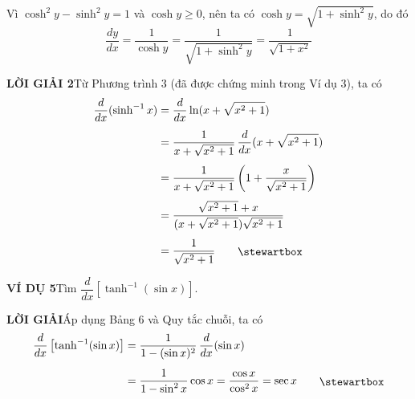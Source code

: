 \noindent
\begin{minipage}[t]{0.26\linewidth}
    \strut
\end{minipage}%
\hfill
\begin{minipage}[t]{0.72\linewidth}
    Vì $\cosh^2 y - \sinh^2 y = 1$ và $\cosh y \geqslant 0$, nên ta có $\cosh y = \sqrt{1 + \sinh^2 y}$, do đó
    \[
    \frac{dy}{dx} = \frac{1}{\cosh y} = \frac{1}{\sqrt{1 + \sinh^2 y}} = \frac{1}{\sqrt{1 + x^2}}
    \]

    \vspace{0.6em}
    \noindent
    \textbf{\textsf{\color{stewartcyan}LỜI GIẢI 2}}\quad Từ Phương trình 3 (đã được chứng minh trong Ví dụ 3), ta có
    \begin{align*}
    \frac{d}{dx}(\sinh^{-1} x) &= \frac{d}{dx}\ln(x + \sqrt{x^2 + 1}) \\[4pt]
    &= \frac{1}{x + \sqrt{x^2 + 1}}\,\frac{d}{dx}(x + \sqrt{x^2 + 1}) \\[4pt]
    &= \frac{1}{x + \sqrt{x^2 + 1}}\left(1 + \frac{x}{\sqrt{x^2 + 1}}\right) \\[4pt]
    &= \frac{\sqrt{x^2 + 1} + x}{(x + \sqrt{x^2 + 1})\sqrt{x^2 + 1}} \\[4pt]
    &= \frac{1}{\sqrt{x^2 + 1}} \tag*{\smash{\raisebox{-1pt}{\stewartbox}}}
    \end{align*}

    \vspace{0.4em}
    \noindent
    \textbf{\textsf{\color{stewartcyan}VÍ DỤ 5}}\quad Tìm $\dfrac{d}{dx}\left[\tanh^{-1}(\sin x)\right]$.

    \vspace{0.6em}
    \noindent
    \textbf{\textsf{\color{stewartcyan}LỜI GIẢI}}\quad Áp dụng Bảng 6 và Quy tắc chuỗi, ta có
    \begin{align*}
    \frac{d}{dx}\left[\tanh^{-1}(\sin x)\right] &= \frac{1}{1 - (\sin x)^2}\,\frac{d}{dx}(\sin x) \\[5pt]
    &= \frac{1}{1 - \sin^2 x}\cos x = \frac{\cos x}{\cos^2 x} = \sec x \tag*{\smash{\raisebox{-1pt}{\stewartbox}}}
    \end{align*}
\end{minipage}

\vspace{24pt}

\noindent
{}

